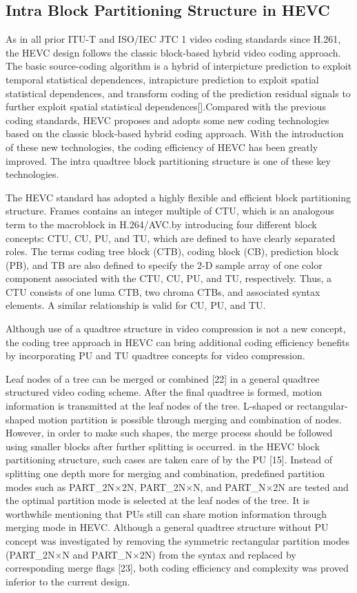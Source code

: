 \documentclass[journal,sort]{IEEEtran}
\begin{document}
\subsection{Intra Block Partitioning Structure in HEVC }
As in all prior ITU-T and ISO/IEC JTC 1 video coding
standards since H.261, the HEVC design follows the
classic block-based hybrid video coding approach. The basic source-coding algorithm is a hybrid
of interpicture prediction to exploit temporal statistical dependences,
intrapicture prediction to exploit spatial statistical
dependences, and transform coding of the prediction residual
signals to further exploit spatial statistical dependences[].Compared with the previous coding standards, HEVC proposes and adopts some new coding technologies based on  the classic block-based hybrid coding approach. With the introduction of these new technologies, the coding efficiency of HEVC has been greatly improved. The intra quadtree block partitioning structure is one of these key technologies.


The HEVC standard has adopted a highly flexible and efficient block partitioning structure. Frames contains an integer multiple of CTU, which is an
analogous term to the macroblock in H.264/AVC.by introducing four different block concepts: CTU, CU, PU, and TU, which are defined to have clearly separated roles. The terms coding tree block (CTB), coding block (CB), prediction block (PB), and TB are also defined to specify the 2-D sample array of one color component associated with the CTU, CU, PU, and TU, respectively. Thus, a CTU consists of one luma CTB, two chroma CTBs, and associated syntax elements. A similar relationship is valid for CU, PU, and TU.

Although use of a quadtree structure in video compression is not a new concept, the coding tree approach in HEVC can bring additional coding efficiency benefits by incorporating PU and TU quadtree concepts for video compression.

Leaf nodes of a tree can be merged or combined [22] in a general quadtree structured video coding scheme. After the final quadtree is formed, motion information is transmitted at the leaf nodes of the tree. L-shaped or rectangular-shaped motion partition is possible through merging and combination of nodes. However, in order to make such shapes, the merge process should be followed using smaller blocks after further splitting is occurred. in the HEVC block partitioning structure, such cases are taken care of by the PU [15]. Instead of splitting one depth more for merging and combination, predefined partition modes such as PART\_2N×2N, PART\_2N×N, and PART\_N×2N are tested and the optimal partition mode is selected at the leaf nodes of the tree. It is worthwhile mentioning that PUs still can share motion information through merging mode in HEVC. Although a general quadtree structure without PU concept was investigated by removing the symmetric rectangular partition modes (PART\_2N×N and PART\_N×2N) from the syntax and replaced by corresponding merge flags [23], both coding efficiency and complexity was proved inferior to the current design.
\end{document}
